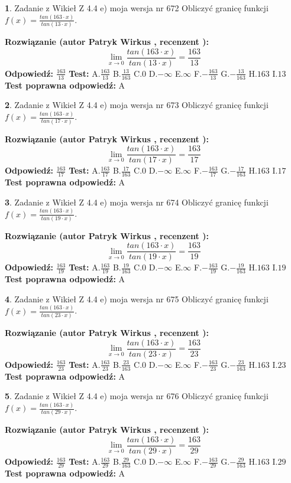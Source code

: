 \documentclass[12pt, a4paper]{article}
\theoremstyle{definition} %
\newtheorem{zad}{}
\newcommand{\zadStart}[1]{\begin{zad}#1\newline}
\newcommand{\zadStop}{\end{zad}}
\newcommand{\rozwStart}[2]{\noindent \textbf{Rozwiązanie (autor #1 , recenzent #2): }\newline}
\newcommand{\rozwStop}{\newline}
\newcommand{\odpStart}{\noindent \textbf{Odpowiedź:}\newline}
\newcommand{\odpStop}{\newline}
\newcommand{\testStart}{\noindent \textbf{Test:}\newline}
\newcommand{\testStop}{\newline}
\newcommand{\kluczStart}{\noindent \textbf{Test poprawna odpowiedź:}\newline}
\newcommand{\kluczStop}{\newline}
\begin{document}
\zadStart{Zadanie z Wikieł Z 4.4 e) moja wersja nr 672}
Obliczyć granicę funkcji $f(x)=\frac{tan(163\cdot x)}{tan(13\cdot x)}$.
\zadStop
\rozwStart{Patryk Wirkus}{}
$$\lim\limits_{x\to 0}\frac{tan(163\cdot x)}{tan(13\cdot x)}=
\frac{163}{13}$$
\rozwStop
\odpStart
$\frac{163}{13}$
\odpStop
\testStart
A.$\frac{163}{13}$
B.$\frac{13}{163}$
C.$0$
D.$-\infty$
E.$\infty$
F.$-\frac{163}{13}$
G.$-\frac{13}{163}$
H.$163$
I.$13$
\testStop
\kluczStart
A
\kluczStop



\zadStart{Zadanie z Wikieł Z 4.4 e) moja wersja nr 673}
Obliczyć granicę funkcji $f(x)=\frac{tan(163\cdot x)}{tan(17\cdot x)}$.
\zadStop
\rozwStart{Patryk Wirkus}{}
$$\lim\limits_{x\to 0}\frac{tan(163\cdot x)}{tan(17\cdot x)}=
\frac{163}{17}$$
\rozwStop
\odpStart
$\frac{163}{17}$
\odpStop
\testStart
A.$\frac{163}{17}$
B.$\frac{17}{163}$
C.$0$
D.$-\infty$
E.$\infty$
F.$-\frac{163}{17}$
G.$-\frac{17}{163}$
H.$163$
I.$17$
\testStop
\kluczStart
A
\kluczStop



\zadStart{Zadanie z Wikieł Z 4.4 e) moja wersja nr 674}
Obliczyć granicę funkcji $f(x)=\frac{tan(163\cdot x)}{tan(19\cdot x)}$.
\zadStop
\rozwStart{Patryk Wirkus}{}
$$\lim\limits_{x\to 0}\frac{tan(163\cdot x)}{tan(19\cdot x)}=
\frac{163}{19}$$
\rozwStop
\odpStart
$\frac{163}{19}$
\odpStop
\testStart
A.$\frac{163}{19}$
B.$\frac{19}{163}$
C.$0$
D.$-\infty$
E.$\infty$
F.$-\frac{163}{19}$
G.$-\frac{19}{163}$
H.$163$
I.$19$
\testStop
\kluczStart
A
\kluczStop



\zadStart{Zadanie z Wikieł Z 4.4 e) moja wersja nr 675}
Obliczyć granicę funkcji $f(x)=\frac{tan(163\cdot x)}{tan(23\cdot x)}$.
\zadStop
\rozwStart{Patryk Wirkus}{}
$$\lim\limits_{x\to 0}\frac{tan(163\cdot x)}{tan(23\cdot x)}=
\frac{163}{23}$$
\rozwStop
\odpStart
$\frac{163}{23}$
\odpStop
\testStart
A.$\frac{163}{23}$
B.$\frac{23}{163}$
C.$0$
D.$-\infty$
E.$\infty$
F.$-\frac{163}{23}$
G.$-\frac{23}{163}$
H.$163$
I.$23$
\testStop
\kluczStart
A
\kluczStop



\zadStart{Zadanie z Wikieł Z 4.4 e) moja wersja nr 676}
Obliczyć granicę funkcji $f(x)=\frac{tan(163\cdot x)}{tan(29\cdot x)}$.
\zadStop
\rozwStart{Patryk Wirkus}{}
$$\lim\limits_{x\to 0}\frac{tan(163\cdot x)}{tan(29\cdot x)}=
\frac{163}{29}$$
\rozwStop
\odpStart
$\frac{163}{29}$
\odpStop
\testStart
A.$\frac{163}{29}$
B.$\frac{29}{163}$
C.$0$
D.$-\infty$
E.$\infty$
F.$-\frac{163}{29}$
G.$-\frac{29}{163}$
H.$163$
I.$29$
\testStop
\kluczStart
A
\kluczStop
\end{document}
